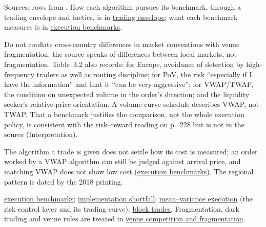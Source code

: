 \begin{qfmethod}
\noindent Sources: rows from \citep[sec.~3.4.1, Table~3.2, p.~230]{alpha-laruelle}. How each algorithm pursues its benchmark, through a trading envelope and tactics, is in \hyperref[def:trading-envelope]{trading envelope}; what each benchmark measures is in \hyperref[def:execution-benchmark]{execution benchmarks}.

 Do not conflate cross-country differences in market conventions with venue fragmentation; the source speaks of differences between local markets, not fragmentation. Table~3.2 also records: for Europe, avoidance of detection by high-frequency traders as well as routing discipline; for PoV, the risk ``especially if I have the information'' and that it ``can be very aggressive''; for VWAP/TWAP, the condition on unexpected volume in the order's direction; and the liquidity seeker's relative-price orientation. A volume-curve schedule describes VWAP, not TWAP. That a benchmark justifies the comparison, not the whole execution policy, is consistent with the risk--reward reading on p.~228 but is not in the source (Interpretation).

The algorithm a trade is given does not settle how its cost is measured; an order worked by a VWAP algorithm can still be judged against arrival price, and matching VWAP does not show low cost (\hyperref[def:execution-benchmark]{execution benchmarks}). The regional pattern is dated by the 2018 printing.

 \hyperref[def:execution-benchmark]{execution benchmarks}; \hyperref[def:implementation-shortfall]{implementation shortfall}; \hyperref[mod:almgren-chriss-execution]{mean--variance execution} (the risk-control layer and its trading curve); \hyperref[def:block-trade]{block trades}. Fragmentation, dark trading and venue rules are treated in \hyperref[mech:venue-competition-fragmentation]{venue competition and fragmentation}.

\end{qfmethod}
